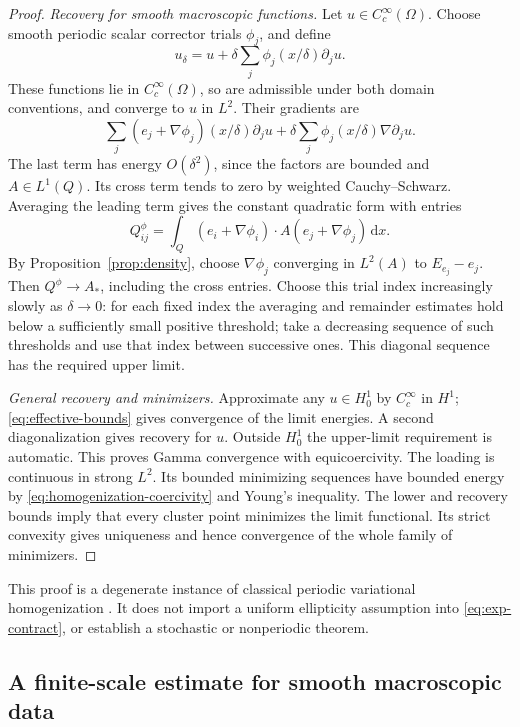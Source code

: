 \documentclass[11pt,a4paper]{article}
\numberwithin{equation}{section}
\theoremstyle{definition}
\theoremstyle{remark}\newtheorem{remark}[theorem]{Remark}
\newcommand{\dd}{\,\mathrm dx}
\begin{document}
\begin{proof}
\emph{Recovery for smooth macroscopic functions.}
Let \(u\in C_c^\infty(\Omega)\). Choose smooth periodic scalar
corrector trials \(\phi_j\), and define
\[
 u_\delta=u+\delta\sum_j\phi_j(x/\delta)\partial_j u.
\]
These functions lie in \(C_c^\infty(\Omega)\), so are admissible
under both domain conventions, and converge to \(u\) in \(L^2\).
Their gradients are
\[
 \sum_j(e_j+\nabla\phi_j)(x/\delta)\partial_j u
       +\delta\sum_j\phi_j(x/\delta)\nabla\partial_j u.
\]
The last term has energy \(O(\delta^2)\), since the factors are
bounded and \(A\in L^1(Q)\). Its cross term tends to zero by
weighted Cauchy--Schwarz. Averaging the leading term gives the
constant quadratic form with entries
\[
 Q^\phi_{ij}=\int_Q(e_i+\nabla\phi_i)\cdot
                             A(e_j+\nabla\phi_j)\dd.
\]
By Proposition~\ref{prop:density}, choose \(\nabla\phi_j\)
converging in \(L^2(A)\) to \(E_{e_j}-e_j\).
Then \(Q^\phi\to A_*\), including the cross entries.
Choose this trial index increasingly slowly as \(\delta\to0\):
for each fixed index the averaging and remainder estimates hold
below a sufficiently small positive threshold; take a decreasing
sequence of such thresholds and use that index between successive
ones. This diagonal sequence has the required upper limit.

\emph{General recovery and minimizers.}
Approximate any \(u\in H^1_0\) by \(C_c^\infty\) in \(H^1\);
\eqref{eq:effective-bounds} gives convergence of the limit energies.
A second diagonalization gives recovery for \(u\).
Outside \(H^1_0\) the upper-limit requirement is automatic.
This proves Gamma convergence with equicoercivity.
The loading is continuous in strong \(L^2\).
Its bounded minimizing sequences have bounded energy by
\eqref{eq:homogenization-coercivity} and Young's inequality.
The lower and recovery bounds imply that every cluster point
minimizes the limit functional. Its strict convexity gives uniqueness
and hence convergence of the whole family of minimizers.
\end{proof}

This proof is a degenerate instance of classical periodic variational
homogenization \cite[Chapter~14]{BraidesDefranceschi1998}.
It does not import a uniform ellipticity assumption into
\eqref{eq:exp-contract}, or establish a stochastic or nonperiodic theorem.


\subsection{A finite-scale estimate for smooth macroscopic data}
\label{subsec:quantitative}
\end{document}
